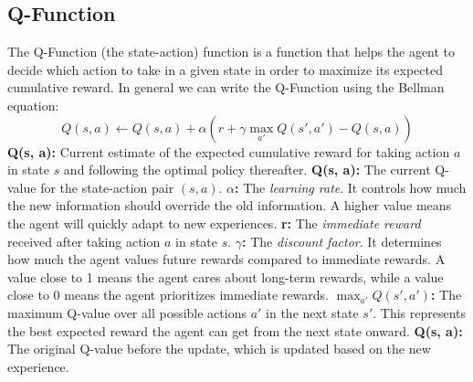 \subsection{Q-Function}
The Q-Function (the state-action) function is a function that helps the agent to decide which action to take in a given state in order to maximize  its expected cumulative reward.
In general we can write the Q-Function using the Bellman equation:
\begin{equation}
Q(s, a) \leftarrow Q(s, a) + \alpha \left( r + \gamma \max_{a'} Q(s', a') - Q(s, a) \right)
\label{non_deteministic_q_function}
\end{equation}
\newline
\textbf{Q(s, a):} Current estimate of the expected cumulative reward for taking action \(a\) in state \(s\) and following the optimal policy thereafter.
\newline
\textbf{Q(s, a):} The current Q-value for the state-action pair \( (s, a) \).
\newline
\textbf{\(\alpha\):} The \textit{learning rate}. It controls how much the new information should override the old information. A higher value means the agent will quickly adapt to new experiences.
\newline
\textbf{r:} The \textit{immediate reward} received after taking action \(a\) in state \(s\).
\newline
\textbf{\(\gamma\):} The \textit{discount factor}. It determines how much the agent values future rewards compared to immediate rewards. A value close to 1 means the agent cares about long-term rewards, while a value close to 0 means the agent prioritizes immediate rewards.
\newline
\textbf{\(\max_{a'} Q(s', a')\):} The maximum Q-value over all possible actions \(a'\) in the next state \(s'\). This represents the best expected reward the agent can get from the next state onward.
\newline
\textbf{Q(s, a):} The original Q-value before the update, which is updated based on the new experience.

